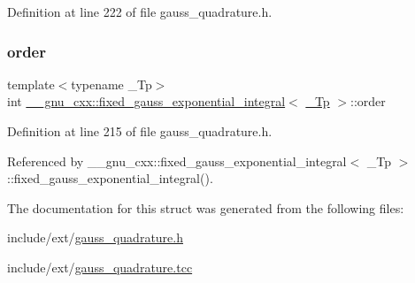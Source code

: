 Definition at line 222 of file gauss\+\_\+quadrature.\+h.

\mbox{\label{struct____gnu__cxx_1_1fixed__gauss__exponential__integral_a2b72985cb9d78eab9a969e304affcc1c}} 
\subsubsection{\texorpdfstring{order}{order}}
{\footnotesize\ttfamily template$<$typename \+\_\+\+Tp$>$ \\
int \hyperlink{struct____gnu__cxx_1_1fixed__gauss__exponential__integral}{\+\_\+\+\_\+gnu\+\_\+cxx\+::fixed\+\_\+gauss\+\_\+exponential\+\_\+integral}$<$ \hyperlink{namespace____gnu__cxx_a3b19a9c800ca194374ef9172290f7d79}{\+\_\+\+Tp} $>$\+::order}



Definition at line 215 of file gauss\+\_\+quadrature.\+h.



Referenced by \+\_\+\+\_\+gnu\+\_\+cxx\+::fixed\+\_\+gauss\+\_\+exponential\+\_\+integral$<$ \+\_\+\+Tp $>$\+::fixed\+\_\+gauss\+\_\+exponential\+\_\+integral().



The documentation for this struct was generated from the following files\+:\begin{DoxyCompactItemize}
\item 
include/ext/\hyperlink{gauss__quadrature_8h}{gauss\+\_\+quadrature.\+h}\item 
include/ext/\hyperlink{gauss__quadrature_8tcc}{gauss\+\_\+quadrature.\+tcc}\end{DoxyCompactItemize}

